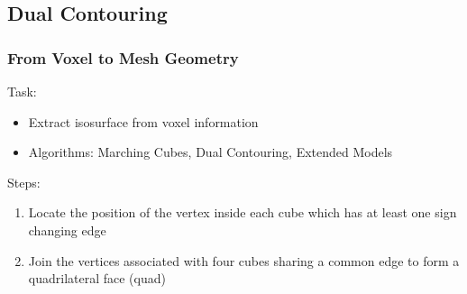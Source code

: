 
\subsection{Dual Contouring}

\begin{frame}
	\frametitle{From Voxel to Mesh Geometry}
	Task:
	\begin{itemize}
	\item Extract isosurface from voxel information
	\item Algorithms: Marching Cubes, Dual Contouring, Extended Models
	\end{itemize}
	Steps: 
	\begin{enumerate}
		\item Locate the position of the vertex inside each cube which has at least one sign changing
		edge
		\item Join the vertices associated with four cubes sharing a common edge to form a quadrilateral face (quad)
	\end{enumerate}
	\begin{minipage}{0.49\textwidth}
\end{minipage}
\end{frame}
